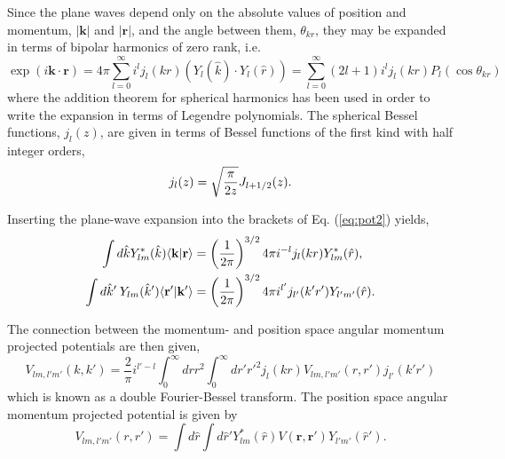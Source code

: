 \documentclass[%
oneside,                 %
final,                   %
10pt]{article}
\begin{document}
Since the plane waves depend only on the absolute values of position and momentum, $\vert\mathbf{k}\vert$ and 
$\vert\mathbf{r}\vert$,
and the angle between them, $\theta_{kr}$, they may be expanded in terms of bipolar harmonics of 
zero rank, i.e.  
\[ 
  \exp{(i \mathbf{k}\cdot \mathbf{r})} = 4\pi\sum_{l=0}^{\infty} i^l j_l(kr)\left( Y_l(\hat{k}) \cdot Y_l(\hat{r}) \right)= \sum_{l=0}^{\infty} (2l+1)i^l j_l(kr) P_l(\cos \theta_{kr}) 
\]
where the addition theorem for spherical harmonics has been used in order to write
the expansion in terms of Legendre polynomials. The spherical Bessel functions, $j_l(z)$,  
are given in terms of Bessel functions of the first kind with half integer orders,  
\[
j_l(z) = \sqrt{\pi \over 2 z} J_{l+1/2}(z).  
\]

Inserting the plane-wave expansion
into the brackets of Eq. (\ref{eq:pot2}) yields, 
\begin{align*}
  \nonumber
  \int d{\hat{k}}  Y_{lm}^*(\hat{k})\langle \mathbf{k}\vert \mathbf{r} \rangle & = 
  \left( {1\over 2\pi} \right) ^{3/2}4\pi i^{-l} j_l(kr) Y_{lm}^*(\hat{r}), \\  
  \nonumber
  \int d{\hat{k}'}\:   Y_{lm}(\hat{k}') \langle \mathbf{r'}\vert \mathbf{k}' \rangle & = 
  \left( {1\over 2\pi} \right) ^{3/2}4\pi i^{l'} j_{l'}(k'r') Y_{l'm'}(\hat{r}). 
\end{align*}

The connection between the momentum- and position space angular momentum 
projected potentials are then given, 
\[
  V_{lm, l'm'}(k,k')=\frac{2}{\pi}i^{l'-l}\int_0^\infty drr^2 \int_0^\infty dr'{r'}^2j_l(kr) V_{lm,l'm'}(r,r') j_{l'}(k'r')
  \label{eq:pot3}
\]
which is known as a double Fourier-Bessel transform. The position space angular 
momentum projected potential is given by
\[
  V_{lm, l'm'}(r,r') = \int d{\hat{r}} \int d{\hat{r}'}Y_{lm}^*(\hat{r})V(\mathbf{r}, \mathbf{r'})Y_{l'm'}(\hat{r}').
  \label{eq:pot4}
\]
\end{document}

